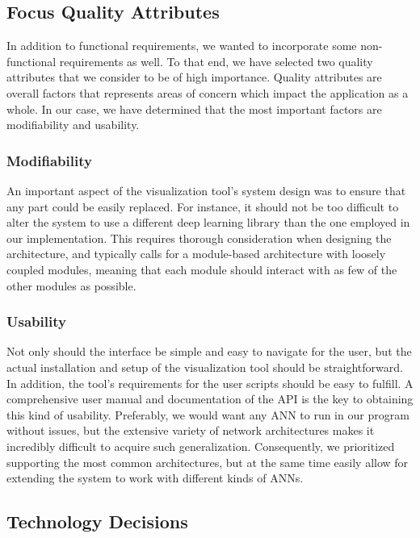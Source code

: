 \subsection{Focus Quality Attributes}

In addition to functional requirements, we wanted to incorporate some non-functional requirements as well. To that end, we have selected two quality attributes that we consider to be of high importance. Quality attributes are overall factors that represents areas of concern which impact the application as a whole. In our case, we have determined that the most important factors are modifiability and usability.

\subsubsection{Modifiability}

An important aspect of the visualization tool's system design was to ensure that any part could be easily replaced. For instance, it should not be too difficult to alter the system to use a different deep learning library than the one employed in our implementation. This requires thorough consideration when designing the architecture, and typically calls for a module-based architecture with loosely coupled modules, meaning that each module should interact with as few of the other modules as possible.

\subsubsection{Usability}

Not only should the interface be simple and easy to navigate for the user, but the actual installation and setup of the visualization tool should be straightforward. In addition, the tool's requirements for the user scripts should be easy to fulfill. A comprehensive user manual and documentation of the API is the key to obtaining this kind of usability. Preferably, we would want any ANN to run in our program without issues, but the extensive variety of network architectures makes it incredibly difficult to acquire such generalization. Consequently, we prioritized supporting the most common architectures, but at the same time easily allow for extending the system to work with different kinds of ANNs.

\subsection{Technology Decisions}

